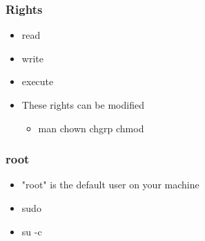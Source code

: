 \begin{frame}
    \frametitle{Rights}
    \begin{itemize}
	\item read
	\item write
	\item execute
	\item These rights can be modified
	\begin{itemize}
	    \item man chown chgrp chmod
	\end{itemize}
    \end{itemize}
\end{frame}


\begin{frame}
    \frametitle{root}
    \begin{itemize}
	\item "root" is the default user on your machine
	\item sudo
	\item su -c
    \end{itemize}
\end{frame}
